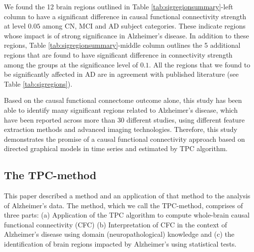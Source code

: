 \documentclass[12pt,reqno]{amsart}
\theoremstyle{definition}
\begin{document}
We found the 12 brain regions outlined in Table \ref{tab:sigregionsummary}-left column to have a significant difference in causal functional connectivity strength at level $0.05$ among CN, MCI and AD subject categories. These indicate regions whose impact is of strong significance in Alzheimer's disease. In addition to these regions, Table \ref{tab:sigregionsummary}-middle column outlines the 5 additional regions that are found to have significant difference in connectivity strength among the groups at the significance level of $0.1$. All the regions that we found to be significantly affected in AD are in agreement with published literature (see Table \ref{tab:sigregions}). 

Based on the causal functional connectome outcome alone, this study has been able to identify many significant regions related to Alzheimer's disease, which have been reported across more than 30 different studies, using different feature extraction methods and advanced imaging technologies. Therefore, this study demonstrates the promise of a causal functional connectivity approach based on directed graphical models in time series and estimated by TPC algorithm. 


\subsection*{The TPC-method}
This paper described a method and an application of that method to the analysis of Alzheimer's data.
The method, which we call the TPC-method, comprises of three parts: 
(a) Application of the TPC algorithm to compute whole-brain causal functional connectivity (CFC)
(b) Interpretation of CFC in the context of Alzheimer's disease using domain (neuropathological) knowledge and 
(c) the identification of brain regions impacted by Alzheimer's using statistical tests.
\end{document}
